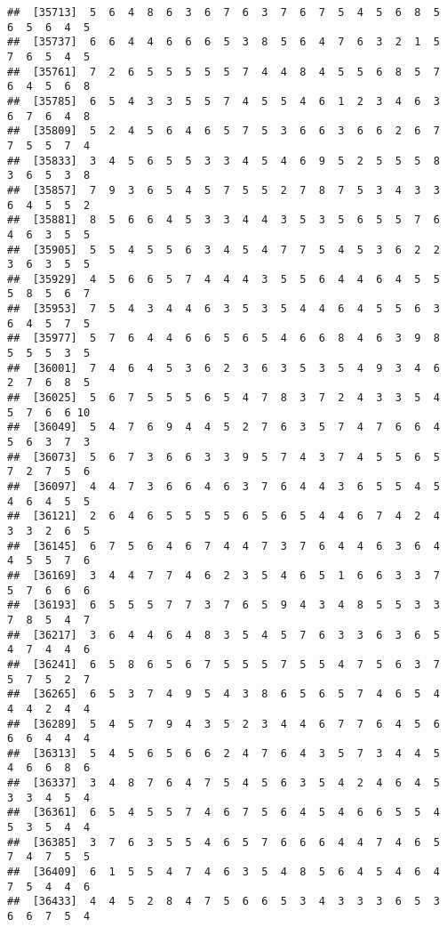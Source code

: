 \documentclass[
]{book}
\begin{document}
\begin{verbatim}
##  [35713]  5  6  4  8  6  3  6  7  6  3  7  6  7  5  4  5  6  8  5  6  5  6  4  5
##  [35737]  6  6  4  4  6  6  6  5  3  8  5  6  4  7  6  3  2  1  5  7  6  5  4  5
##  [35761]  7  2  6  5  5  5  5  5  7  4  4  8  4  5  5  6  8  5  7  6  4  5  6  8
##  [35785]  6  5  4  3  3  5  5  7  4  5  5  4  6  1  2  3  4  6  3  6  7  6  4  8
##  [35809]  5  2  4  5  6  4  6  5  7  5  3  6  6  3  6  6  2  6  7  7  5  5  7  4
##  [35833]  3  4  5  6  5  5  3  3  4  5  4  6  9  5  2  5  5  5  8  3  6  5  3  8
##  [35857]  7  9  3  6  5  4  5  7  5  5  2  7  8  7  5  3  4  3  3  6  4  5  5  2
##  [35881]  8  5  6  6  4  5  3  3  4  4  3  5  3  5  6  5  5  7  6  4  6  3  5  5
##  [35905]  5  5  4  5  5  6  3  4  5  4  7  7  5  4  5  3  6  2  2  3  6  3  5  5
##  [35929]  4  5  6  6  5  7  4  4  4  3  5  5  6  4  4  6  4  5  5  5  8  5  6  7
##  [35953]  7  5  4  3  4  4  6  3  5  3  5  4  4  6  4  5  5  6  3  6  4  5  7  5
##  [35977]  5  7  6  4  4  6  6  5  6  5  4  6  6  8  4  6  3  9  8  5  5  5  3  5
##  [36001]  7  4  6  4  5  3  6  2  3  6  3  5  3  5  4  9  3  4  6  2  7  6  8  5
##  [36025]  5  6  7  5  5  5  6  5  4  7  8  3  7  2  4  3  3  5  4  5  7  6  6 10
##  [36049]  5  4  7  6  9  4  4  5  2  7  6  3  5  7  4  7  6  6  4  5  6  3  7  3
##  [36073]  5  6  7  3  6  6  3  3  9  5  7  4  3  7  4  5  5  6  5  7  2  7  5  6
##  [36097]  4  4  7  3  6  6  4  6  3  7  6  4  4  3  6  5  5  4  5  4  6  4  5  5
##  [36121]  2  6  4  6  5  5  5  5  6  5  6  5  4  4  6  7  4  2  4  3  3  2  6  5
##  [36145]  6  7  5  6  4  6  7  4  4  7  3  7  6  4  4  6  3  6  4  4  5  5  7  6
##  [36169]  3  4  4  7  7  4  6  2  3  5  4  6  5  1  6  6  3  3  7  5  7  6  6  6
##  [36193]  6  5  5  5  7  7  3  7  6  5  9  4  3  4  8  5  5  3  3  7  8  5  4  7
##  [36217]  3  6  4  4  6  4  8  3  5  4  5  7  6  3  3  6  3  6  5  4  7  4  4  6
##  [36241]  6  5  8  6  5  6  7  5  5  5  7  5  5  4  7  5  6  3  7  5  7  5  2  7
##  [36265]  6  5  3  7  4  9  5  4  3  8  6  5  6  5  7  4  6  5  4  4  4  2  4  4
##  [36289]  5  4  5  7  9  4  3  5  2  3  4  4  6  7  7  6  4  5  6  6  6  4  4  4
##  [36313]  5  4  5  6  5  6  6  2  4  7  6  4  3  5  7  3  4  4  5  4  6  6  8  6
##  [36337]  3  4  8  7  6  4  7  5  4  5  6  3  5  4  2  4  6  4  5  3  3  4  5  4
##  [36361]  6  5  4  5  5  7  4  6  7  5  6  4  5  4  6  6  5  5  4  5  3  5  4  4
##  [36385]  3  7  6  3  5  5  4  6  5  7  6  6  6  4  4  7  4  6  5  7  4  7  5  5
##  [36409]  6  1  5  5  4  7  4  6  3  5  4  8  5  6  4  5  4  6  4  7  5  4  4  6
##  [36433]  4  4  5  2  8  4  7  5  6  6  5  3  4  3  3  3  6  5  3  6  6  7  5  4

\end{verbatim}
\end{document}
